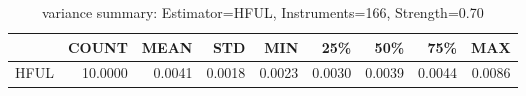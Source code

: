 \begin{table}[ht]
\centering
\caption{variance summary: Estimator=HFUL, Instruments=166, Strength=0.70}
\begin{tabular}{lrrrrrrrr}
\toprule
 & COUNT & MEAN & STD & MIN & 25\% & 50\% & 75\% & MAX \\
\midrule
HFUL & 10.0000 & 0.0041 & 0.0018 & 0.0023 & 0.0030 & 0.0039 & 0.0044 & 0.0086 \\
\bottomrule
\end{tabular}
\end{table}
